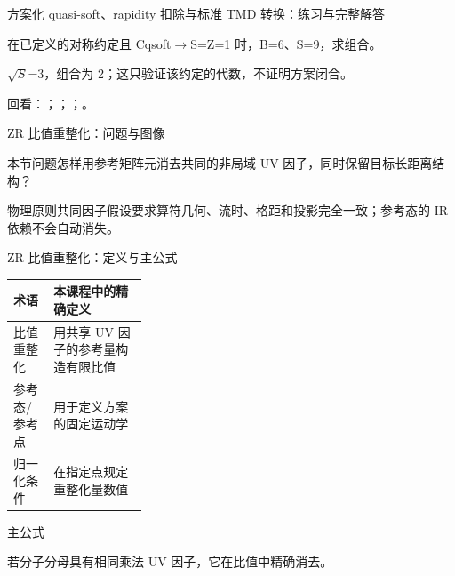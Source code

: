 \begin{frame}[t]{方案化 quasi-soft、rapidity 扣除与标准 TMD 转换：练习与完整解答}
\footnotesize
\begin{block}{}在已定义的对称约定且 Cqsoft\ensuremath{\rightarrow}S=Z=1 时，B=6、S=9，求组合。\end{block}
\begin{exampleblock}{}\ensuremath{\sqrt{S}}=3，组合为 2；这只验证该约定的代数，不证明方案闭合。\end{exampleblock}
\vfill
\scriptsize 回看：；；；。
\end{frame}

\begin{frame}[t]{ZR 比值重整化：问题与图像}
\footnotesize
\begin{block}{本节问题}怎样用参考矩阵元消去共同的非局域 UV 因子，同时保留目标长距离结构？\end{block}
\begin{block}{物理原则}\quad 共同因子假设要求算符几何、流时、格距和投影完全一致；参考态的 IR 依赖不会自动消失。\end{block}
\end{frame}

\begin{frame}[t]{ZR 比值重整化：定义与主公式}
\footnotesize\begin{tabularx}{\linewidth}{p{0.30\linewidth}Y}
\toprule 术语 & 本课程中的精确定义\\\midrule
{} 比值重整化 & 用共享 UV 因子的参考量构造有限比值\\
 参考态/\allowbreak{}参考点 & 用于定义方案的固定运动学\\
 归一化条件 & 在指定点规定重整化量数值\\
\bottomrule\end{tabularx}\vspace{0.15cm}
\begin{block}{ 主公式}\centering{}\end{block}
若分子分母具有相同乘法 UV 因子，它在比值中精确消去。
\end{frame}

